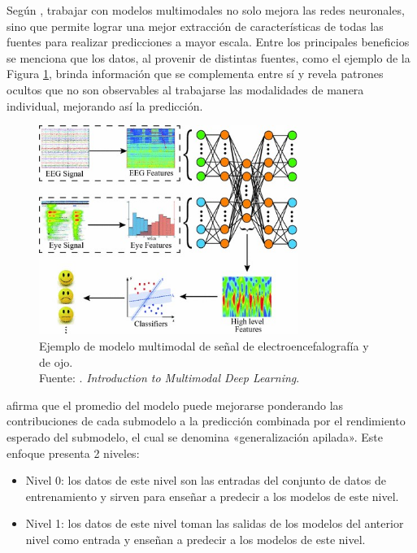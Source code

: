 Según \cite{tec_baheti2020introduction_mdl}, trabajar con modelos multimodales no solo mejora las redes neuronales, sino que permite lograr una mejor extracción de características de todas las fuentes para realizar predicciones a mayor escala. Entre los principales beneficios se menciona que los datos, al provenir de distintas fuentes, como el ejemplo de la Figura \ref{2:fig7}, brinda información que se complementa entre sí y revela patrones ocultos que no son observables al trabajarse las modalidades de manera individual, mejorando así la predicción.

\begin{figure}[!ht]
	\begin{center}
		\includegraphics[width=0.75\textwidth]{2/figures/multimodal_deep_learning_example.jpg}
		\caption[Ejemplo de modelo multimodal de señal de electroencefalografía y de ojo]{Ejemplo de modelo multimodal de señal de electroencefalografía y de ojo.\\
		Fuente: \cite{tec_baheti2020introduction_mdl}. \textit{Introduction to Multimodal Deep Learning}.}
		\label{2:fig7}
	\end{center}
\end{figure}

\cite{tec_brownlee2018stacked_models} afirma que el promedio del modelo puede mejorarse ponderando las contribuciones de cada submodelo a la predicción combinada por el rendimiento esperado del submodelo, el cual se denomina «generalización apilada». Este enfoque presenta 2 niveles:
\begin{itemize}
	\item Nivel 0: los datos de este nivel son las entradas del conjunto de datos de entrenamiento y sirven para enseñar a predecir a los modelos de este nivel.
	\item Nivel 1: los datos de este nivel toman las salidas de los modelos del anterior nivel como entrada y enseñan a predecir a los modelos de este nivel.
\end{itemize}

